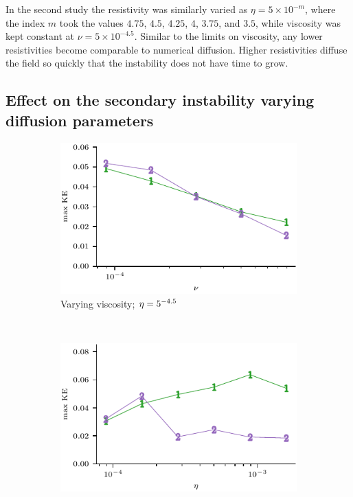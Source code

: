 In the second study the resistivity was similarly varied as $\eta = 5 \times 10^{-m}$, where the index $m$ took the values $4.75$, $4.5$, $4.25$, $4$, $3.75$, and $3.5$, while viscosity was kept constant at $\nu = 5\times 10^{-4.5}$. Similar to the limits on viscosity, any lower resistivities become comparable to numerical diffusion. Higher resistivities diffuse the field so quickly that the instability does not have time to grow.

\subsection{Effect on the secondary instability varying diffusion parameters}
\label{sec:secondary_instability}

\begin{figure}[t]
    \centering
    \begin{subfigure}[t]{0.5\textwidth}
      \includegraphics[width=\textwidth]{max_ke_split_inst_changing_viscosity.pdf}
      \caption{Varying viscosity; $\eta = 5\time 10^{-4.5}$}
    \end{subfigure}%
    ~
    \begin{subfigure}[t]{0.5\textwidth}
      \includegraphics[width=\textwidth]{max_ke_split_inst_changing_resistivity.pdf}

\end{subfigure}
\end{figure}
